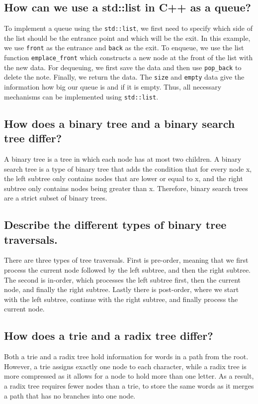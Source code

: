 \documentclass[runningheads]{llncs}
\begin{document}
\subsection*{How can we use a std::list in C++ as a queue?}
To implement a queue using the \verb|std::list|, we first need to specify which side of the list should be the entrance point
and which will be the exit. In this example, we use \verb|front| as the entrance and \verb|back| as the exit. To enqueue,
we use the list function \verb|emplace_front| which constructs a new node at the front of the list with the new data. For
dequeuing, we first save the data and then use \verb|pop_back| to delete the note. Finally, we return the data. The
\verb|size| and \verb|empty| data give the information how big our queue is and if it is empty. Thus, all necessary
mechanisms can be implemented using \verb|std::list|.

\subsection*{How does a binary tree and a binary search tree differ?}
A binary tree is a tree in which each node has at most two children. A binary search tree is a type of binary tree that adds
the condition that for every node x, the left subtree only contains nodes that are lower or equal to x, and the right subtree only contains
nodes being greater than x. Therefore, binary search trees are a strict subset of binary trees.

\subsection*{Describe the different types of binary tree traversals.}
There are three types of tree traversals. First is pre-order, meaning that we first process the current node followed by the left
subtree, and then the right subtree. The second is in-order, which processes the left subtree first, then the current node, and finally
the right subtree. Lastly there is post-order, where we start with the left subtree, continue with the right subtree, and finally process
the current node.

\subsection*{How does a trie and a radix tree differ?}
Both a trie and a radix tree hold information for words in a path from the root. However, a trie assigns exactly one node to each character,
while a radix tree is more compressed as it allows for a node to hold more than one letter. As a result, a radix tree requires fewer nodes than
a trie, to store the same words as it merges a path that has no branches into one node.
\end{document}
